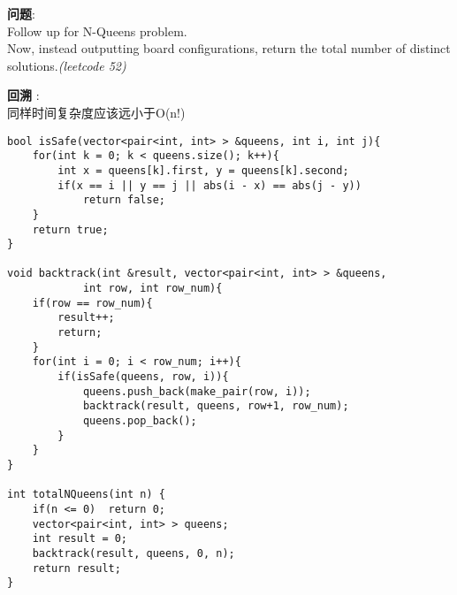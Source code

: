     
\begin{description}
    \item{\textbf{问题}}:\\
Follow up for N-Queens problem.\\
Now, instead outputting board configurations, return the total number of distinct solutions.\textit{(leetcode 52)}
    \item{\textbf{回溯}} : 
    \\同样时间复杂度应该远小于O(n!)
    \begin{lstlisting}
bool isSafe(vector<pair<int, int> > &queens, int i, int j){
	for(int k = 0; k < queens.size(); k++){
		int x = queens[k].first, y = queens[k].second;
		if(x == i || y == j || abs(i - x) == abs(j - y))
			return false;
	}
	return true;
}

void backtrack(int &result, vector<pair<int, int> > &queens,
			int row, int row_num){
	if(row == row_num){
		result++;
		return;
	}
	for(int i = 0; i < row_num; i++){
		if(isSafe(queens, row, i)){
			queens.push_back(make_pair(row, i));
			backtrack(result, queens, row+1, row_num);
			queens.pop_back();
		}
	}
}

int totalNQueens(int n) {
	if(n <= 0)	return 0;
	vector<pair<int, int> > queens;
	int result = 0;
	backtrack(result, queens, 0, n);
	return result;
}
    \end{lstlisting}
\end{description}
